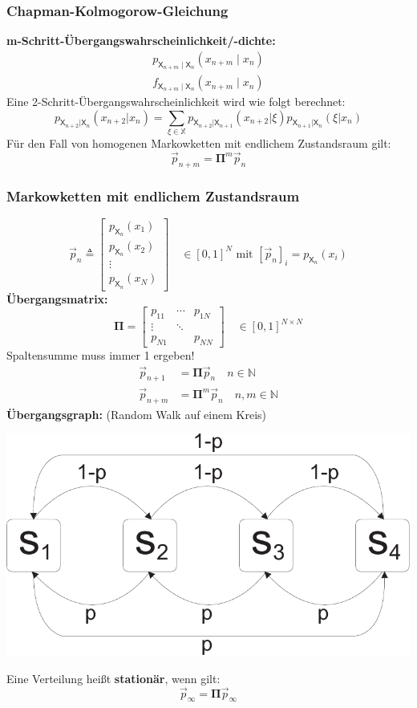 \documentclass[a4paper,twocolumn,10pt]{article}
\begin{document}
\subsubsection{Chapman-Kolmogorow-Gleichung}
\textbf{m-Schritt-Übergangswahrscheinlichkeit/-dichte:}
\begin{align} p_{\mathsf{X}_{n+m} \mid \mathsf{X}_{n}}(x_{n+m} \mid x_{n}) \nonumber \\
 f_{\mathsf{X}_{n+m} \mid \mathsf{X}_{n}}(x_{n+m} \mid x_{n}) \nonumber
\end{align}
Eine 2-Schritt-Übergangswahrscheinlichkeit wird wie folgt berechnet:
\[p_{\mathsf{X}_{n+2}|\mathsf{X}_n}(x_{n+2}|x_n)=\sum\limits_{\xi\in\mathbb{X}}p_{\mathsf{X}_{n+2}|\mathsf{X}_{n+1}}(x_{n+2}|\xi)p_{\mathsf{X}_{n+1}|\mathsf{X}_n}(\xi |x_n) \]
Für den Fall von homogenen Markowketten mit endlichem Zustandsraum gilt:
\[\overrightarrow{p}_{n+m}=\mathbf{\Pi}^m\overrightarrow{p}_n\]

\subsubsection{Markowketten mit endlichem Zustandsraum}
\[ \vec{p}_{n} \triangleq \begin{bmatrix} p_{\mathsf{X}_{n}}(x_{1}) \\ p_{\mathsf{X}_{n}}(x_{2}) \\ \vdots \\ p_{\mathsf{X}_{n}}(x_{N}) \end{bmatrix} \quad \in [0,1]^{N}\text{ mit }[\vec{p}_{n}]_{i} = p_{\mathsf{X}_{n}}(x_{i}) \]
\textbf{Übergangsmatrix:}
\[ \mathbf{\Pi} = \begin{bmatrix} p_{11} & \cdots & p_{1N} \\ \vdots & \ddots &   \\ p_{N1} & & p_{NN} \end{bmatrix} \quad \in [0,1]^{N \times N}\]
Spaltensumme muss immer 1 ergeben!
\begin{align}
\vec{p}_{n+1} & = \mathbf{\Pi} \vec{p}_{n} \quad n \in \mathbb{N}\nonumber \\
\vec{p}_{n+m} & = \mathbf{\Pi}^{m} \vec{p}_{n} \quad n, m \in \mathbb{N} \nonumber 
\end{align}
\textbf{Übergangsgraph:} (Random Walk auf einem Kreis)\\
\begin{center}
\includegraphics[width=0.4\columnwidth]{Grafiken/Uebergangsgraph}
\end{center}
Eine Verteilung heißt \textbf{stationär}, wenn gilt:
\[\overrightarrow{p}_{\infty}=\mathbf{\Pi}\overrightarrow{p}_{\infty}\]
\end{document}
